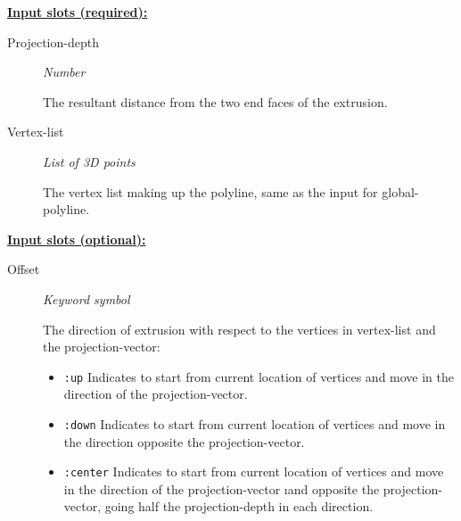 \documentclass [11pt]{book}
\begin{document}
\begin{itemize}
\begin{figure}
\end{figure}





\textbf{
\underline{Input slots (required):}}

\begin{description}

\item [Projection-depth]
\emph{Number}

 The resultant distance from the two end faces of the extrusion.




\item [Vertex-list]
\emph{List of 3D points}

 The vertex list making up the polyline, same as the input for global-polyline.




\end{description}






\textbf{
\underline{Input slots (optional):}}

\begin{description}

\item [Offset]
\emph{Keyword symbol}

 The direction of extrusion with respect to the vertices in vertex-list and the projection-vector:


\begin{itemize}

\item \texttt{:up} Indicates to start from current location of vertices and move in the direction of
the projection-vector.


\item \texttt{:down} Indicates to start from current location of vertices and move in the direction opposite
the projection-vector.


\item \texttt{:center} Indicates to start from current location of vertices and move in the direction of
the projection-vector 
\i{and} opposite the projection-vector, going half the projection-depth in
each direction.


\end{itemize}







\end{description}
\end{itemize}
\end{document}
